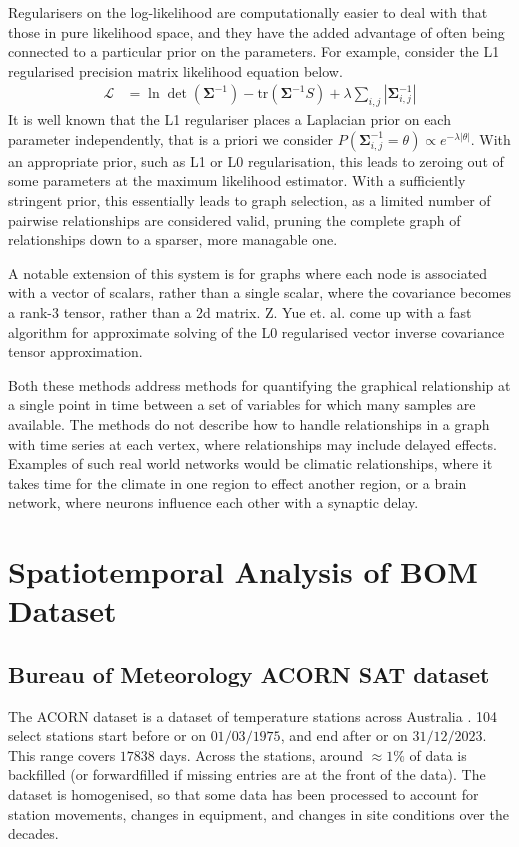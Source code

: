 \documentclass[12pt,a4paper]{article} %
\begin{document}
Regularisers on the log-likelihood are computationally easier to deal with that those in pure likelihood space, and they have the added advantage of often being connected to a particular prior on the parameters. For example, consider the L1 regularised precision matrix likelihood equation below.
\begin{align*}
    \mathcal{L}&=\ln\det(\pmb{\Sigma}^{-1})-\text{tr}(\pmb{\Sigma}^{-1}S)+\lambda\sum_{i,j}|\pmb{\Sigma}^{-1}_{i,j}|
\end{align*}
It is well known \cite{park} that the L1 regulariser places a Laplacian prior on each parameter independently, that is a priori we consider $P(\pmb{\Sigma}^{-1}_{i,j}=\theta)\propto e^{-\lambda|\theta|}$. With an appropriate prior, such as L1 or L0 regularisation, this leads to zeroing out of some parameters at the maximum likelihood estimator. With a sufficiently stringent prior, this essentially leads to graph selection, as a limited number of pairwise relationships are considered valid, pruning the complete graph of relationships down to a sparser, more managable one.

A notable extension of this system is for graphs where each node is associated with a vector of scalars, rather than a single scalar, where the covariance becomes a rank-3 tensor, rather than a 2d matrix. Z. Yue et. al. \cite{yue} come up with a fast algorithm for approximate solving of the L0 regularised vector inverse covariance tensor approximation.

Both these methods address methods for quantifying the graphical relationship at a single point in time between a set of variables for which many samples are available. The methods do not describe how to handle relationships in a graph with time series at each vertex, where relationships may include delayed effects. Examples of such real world networks would be climatic relationships, where it takes time for the climate in one region to effect another region, or a brain network, where neurons influence each other with a synaptic delay.

\newpage
\section{Spatiotemporal Analysis of BOM Dataset}
\subsection{Bureau of Meteorology ACORN SAT dataset}
\label{subsec:BOM}
The ACORN dataset is a dataset of temperature stations across Australia \cite{bom}. 104 select stations start before or on $01/03/1975$, and end after or on $31/12/2023$. This range covers $17838$ days. Across the stations, around $\approx1\%$ of data is backfilled (or forwardfilled if missing entries are at the front of the data). The dataset is homogenised, so that some data has been processed to account for station movements, changes in equipment, and changes in site conditions over the decades.
\end{document}
